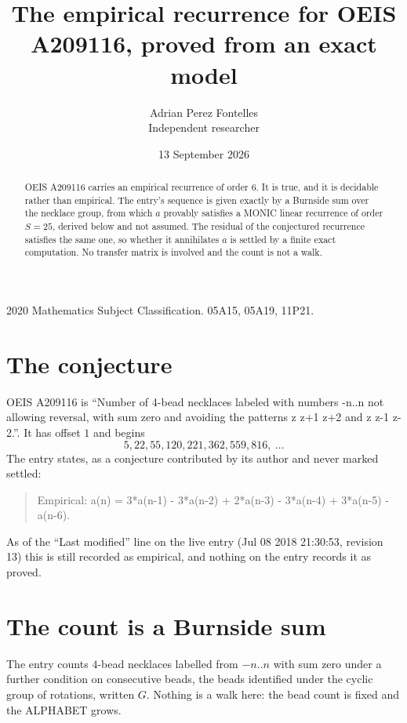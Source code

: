 \documentclass[11pt,a4paper]{article}
\title{The empirical recurrence for OEIS A209116, proved from an exact model}
\author{Adrian Perez Fontelles\\ \small Independent researcher}
\date{13 September 2026}
\theoremstyle{plain}
\theoremstyle{definition}
\begin{document}
\maketitle

\begin{abstract}
OEIS A209116 carries an empirical recurrence of order $6$. It is true, and it is
decidable rather than empirical. The entry's sequence is given exactly by a Burnside sum over the necklace group, from
which $a$ provably satisfies a MONIC linear recurrence of order $S=25$, derived below and not
assumed. The residual of the conjectured recurrence satisfies the same one, so whether it
annihilates $a$ is settled by a finite exact computation. No transfer matrix is involved and
the count is not a walk.
\end{abstract}

\noindent\small 2020 Mathematics Subject Classification. 05A15, 05A19, 11P21.\normalsize

\section{The conjecture}

OEIS A209116 is ``Number of 4-bead necklaces labeled with numbers -n..n not allowing reversal, with sum zero and avoiding the patterns z z+1 z+2 and z z-1 z-2.''. It has offset $1$ and begins
\[
5, 22, 55, 120, 221, 362, 559, 816,\ \dots
\]
The entry states, as a conjecture contributed by its author and never marked settled:
\begin{quote}
Empirical: a(n) = 3*a(n-1) - 3*a(n-2) + 2*a(n-3) - 3*a(n-4) + 3*a(n-5) - a(n-6).
\end{quote}
As of the ``Last modified'' line on the live entry (Jul 08 2018 21:30:53, revision 13)
this is still recorded as empirical, and nothing on the entry records it as proved.

\section{The count is a Burnside sum}

The entry counts $4$-bead necklaces labelled from $-n..n$ with sum zero under a further
condition on consecutive beads, the beads identified under the cyclic group of rotations, written $G$. Nothing is a
walk here: the bead count is fixed and the ALPHABET grows.
\end{document}
